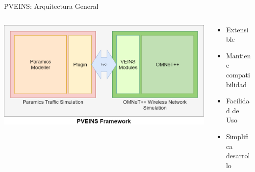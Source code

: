 \documentclass[aspectratio=169]{beamer}
\begin{document}
\begin{frame}{PVEINS: Arquitectura General}
\begin{columns}
    \begin{column}{.7\linewidth}
        \centering
        \includegraphics[width=\linewidth]{figuras/PVEINSArch.png}
    \end{column}
    \begin{column}{.3\linewidth}
        \begin{itemize}
            \item Extensible
            \item Mantiene compatibilidad
            \item Facilidad de Uso
            \item Simplifica desarrollo
        \end{itemize}
    \end{column}
\end{columns}
\end{frame}
\end{document}
